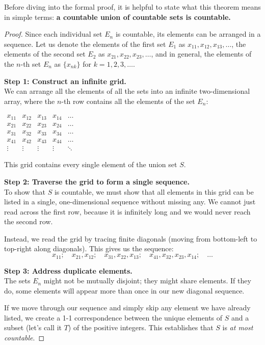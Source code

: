 \documentclass{article}
\theoremstyle{mythm}
\begin{document}
Before diving into the formal proof, it is helpful to state what this theorem means in simple terms: \textbf{a countable union of countable sets is countable.}

\begin{proof}
Since each individual set $E_n$ is countable, its elements can be arranged in a sequence. Let us denote the elements of the first set $E_1$ as $x_{11}, x_{12}, x_{13}, \dots$, the elements of the second set $E_2$ as $x_{21}, x_{22}, x_{23}, \dots$, and in general, the elements of the $n$-th set $E_n$ as $\{x_{nk}\}$ for $k = 1, 2, 3, \dots$.

\textbf{Step 1: Construct an infinite grid.} \\
We can arrange all the elements of all the sets into an infinite two-dimensional array, where the $n$-th row contains all the elements of the set $E_n$:
\begin{center}
$
\begin{array}{ccccc}
x_{11} & x_{12} & x_{13} & x_{14} & \dots \\
x_{21} & x_{22} & x_{23} & x_{24} & \dots \\
x_{31} & x_{32} & x_{33} & x_{34} & \dots \\
x_{41} & x_{42} & x_{43} & x_{44} & \dots \\
\vdots & \vdots & \vdots & \vdots & \ddots 
\end{array}
$
\end{center}
This grid contains every single element of the union set $S$.

\textbf{Step 2: Traverse the grid to form a single sequence.} \\
To show that $S$ is countable, we must show that all elements in this grid can be listed in a single, one-dimensional sequence without missing any. We cannot just read across the first row, because it is infinitely long and we would never reach the second row. 

Instead, we read the grid by tracing finite diagonals (moving from bottom-left to top-right along diagonals). This gives us the sequence:
\[
x_{11}; \quad x_{21}, x_{12}; \quad x_{31}, x_{22}, x_{13}; \quad x_{41}, x_{32}, x_{23}, x_{14}; \quad \dots
\]

\textbf{Step 3: Address duplicate elements.} \\
The sets $E_n$ might not be mutually disjoint; they might share elements. If they do, some elements will appear more than once in our new diagonal sequence. 

If we move through our sequence and simply skip any element we have already listed, we create a 1-1 correspondence between the unique elements of $S$ and a subset (let's call it $T$) of the positive integers. This establishes that $S$ is \textit{at most countable}.


\end{proof}
\end{document}

